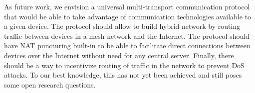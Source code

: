 \documentclass[conference,compsoc]{IEEEtran}
\begin{document}
As future work, we envision a universal multi-transport communication protocol that would be able to take advantage of communication technologies available to a given device. The protocol should allow to build hybrid network by routing traffic between devices in a mesh network and the Internet. The protocol should have NAT puncturing built-in to be able to facilitate direct connections between devices over the Internet without need for any central server. Finally, there should be a way to incentivize routing of traffic in the network to prevent DoS attacks. To our best knowledge, this has not yet been achieved and still poses some open research questions.



\end{document}
